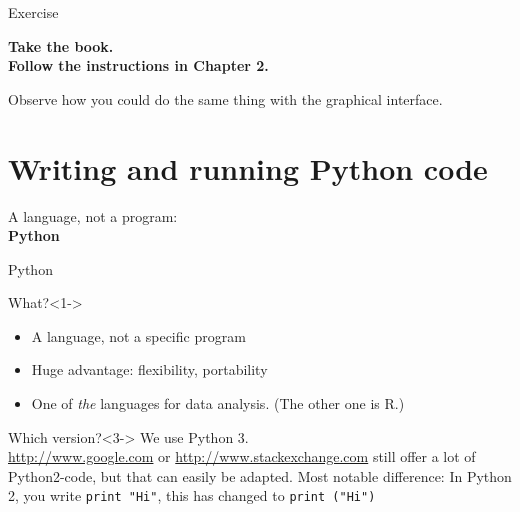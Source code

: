 \documentclass{beamer}
\begin{document}
\begin{frame}
	Exercise 
	
	\vspace{1cm}
	\textbf{Take the book.\\Follow the instructions in Chapter 2.}
	
	Observe how you could do the same thing with the graphical interface.
\end{frame}




\section{Writing and running Python code}

\begin{frame}
	A language, not a program:\\
	\textbf{Python}
\end{frame}


\begin{frame}{Python}
	\begin{block}{What?}<1->
		\begin{itemize}
			\item A language, not a specific program
			\item Huge advantage: flexibility, portability
			\item One of \emph{the} languages for data analysis. \tiny{(The other one is R.)}
		\end{itemize}
	\end{block}
	
	\begin{block}{Which version?}<3->
		We use Python 3. \\ 
		\footnotesize{\url{http://www.google.com} or \url{http://www.stackexchange.com} still offer a lot of Python2-code, but that can easily be adapted. Most notable difference: In Python 2, you write {\tt print "Hi"}, this has changed to {\tt print ("Hi")}}\\
	\end{block}
\end{frame}
\end{document}
